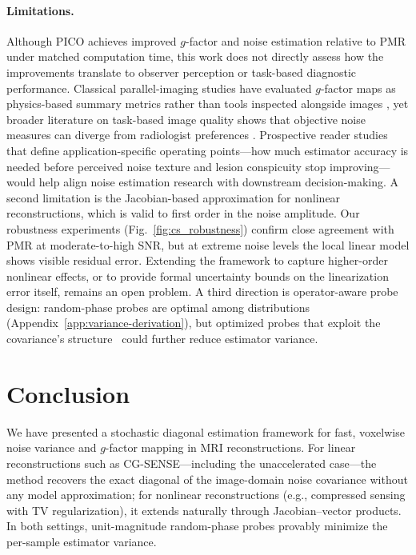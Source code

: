\documentclass[AMA,STIX2COL,Linenumberson]{MRM}
\begin{document}
\paragraph{Limitations.}
Although PICO achieves improved $g$-factor 
and noise estimation relative to PMR under matched computation 
time, this work does not directly assess how the improvements 
translate to observer perception or task-based diagnostic 
performance. Classical parallel-imaging studies have evaluated 
$g$-factor maps as physics-based summary metrics rather than 
tools inspected alongside images 
\cite{pruessmann1999sense,robson2008snrgfactor,breuer2009grappagfactor}, 
yet broader literature on task-based image quality shows that 
objective noise measures can diverge from radiologist 
preferences \cite{barrett2015task,kastryulin2023iqamri,
ma2024radiqmri,tang2025rankiqmri}. Prospective reader studies 
that define application-specific operating points---how much 
estimator accuracy is needed before perceived noise texture 
and lesion conspicuity stop improving---would help align noise 
estimation research with downstream decision-making. A second 
limitation is the Jacobian-based approximation for nonlinear 
reconstructions, which is valid to first order in the noise 
amplitude. Our robustness experiments 
(Fig.~\ref{fig:cs_robustness}) confirm close agreement with 
PMR at moderate-to-high SNR, but at extreme noise levels the 
local linear model shows visible residual error. Extending 
the framework to capture higher-order nonlinear effects, or 
to provide formal uncertainty bounds on the linearization 
error itself, remains an open problem. %
A third direction is operator-aware probe design: 
random-phase probes are optimal among distributions 
(Appendix~\ref{app:variance-derivation}), but 
optimized probes that exploit the covariance's structure~\cite{bekas} 
could further reduce estimator variance.


\section{Conclusion}
We have presented a stochastic diagonal estimation framework 
for fast, voxelwise noise variance and $g$-factor mapping in 
MRI reconstructions. For linear reconstructions such as 
CG-SENSE---including the unaccelerated case---the method 
recovers the exact diagonal of the image-domain noise 
covariance without any model approximation; for nonlinear 
reconstructions (e.g., compressed sensing with TV 
regularization), it extends naturally through Jacobian--vector 
products. In both settings, unit-magnitude random-phase probes provably minimize the per-sample estimator variance.
 
\end{document}
